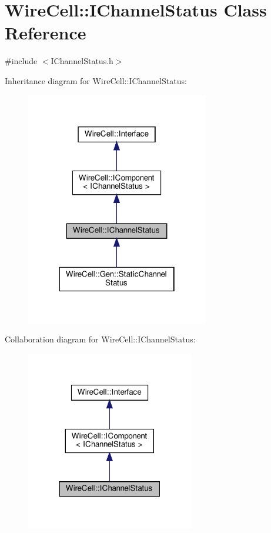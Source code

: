 \hypertarget{class_wire_cell_1_1_i_channel_status}{}\section{Wire\+Cell\+:\+:I\+Channel\+Status Class Reference}
\label{class_wire_cell_1_1_i_channel_status}


{\ttfamily \#include $<$I\+Channel\+Status.\+h$>$}



Inheritance diagram for Wire\+Cell\+:\+:I\+Channel\+Status\+:
\nopagebreak
\begin{figure}[H]
\begin{center}
\leavevmode
\includegraphics[width=226pt]{class_wire_cell_1_1_i_channel_status__inherit__graph}
\end{center}
\end{figure}


Collaboration diagram for Wire\+Cell\+:\+:I\+Channel\+Status\+:
\nopagebreak
\begin{figure}[H]
\begin{center}
\leavevmode
\includegraphics[width=208pt]{class_wire_cell_1_1_i_channel_status__coll__graph}
\end{center}
\end{figure}
